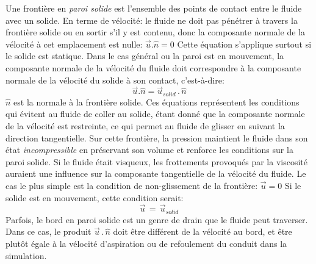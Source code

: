 \documentclass[11pt]{article}
\begin{document}
Une frontière en \textit{paroi solide} est l'ensemble des points de contact entre le fluide avec un solide. En terme de vélocité: le fluide ne doit pas pénétrer à travers la frontière solide ou en sortir s'il y est contenu, donc la composante normale de la vélocité à cet emplacement est nulle: $\overrightarrow{u}.\hat{n} = 0$ \newline
Cette équation s'applique surtout si le solide est statique. Dans le cas général ou la paroi est en mouvement, la composante normale de la vélocité du fluide doit correspondre à la composante normale de la vélocité du solide à son contact, c'est-à-dire:
	\begin{equation}
	\overrightarrow{u}.\hat{n} = \overrightarrow{u}\!	\!_{solid} \,.\, \hat{n}
	\end{equation}
$ \hat{n} $ est la normale à la frontière solide.
Ces équations représentent les conditions qui évitent au fluide de coller au solide, étant donné que la composante normale de la vélocité est restreinte, ce qui permet au fluide de glisser en suivant la direction tangentielle.
Sur cette frontière, la pression maintient le fluide dans son état \textit{incompressible} en préservant son volume et renforce les conditions sur la paroi solide.\newline 
Si le fluide était visqueux, les frottements provoqués par la viscosité auraient une influence sur la composante tangentielle de la vélocité du fluide. Le cas le plus simple est la condition de non-glissement de la frontière:
$\overrightarrow{u} = 0$ \newline
Si le solide est en mouvement, cette condition serait:
\begin{equation}
\overrightarrow{u} \,=\, \overrightarrow{u}\!\!_{solid}
\end{equation}
Parfois, le bord en paroi solide est un genre de drain que le fluide peut traverser. Dans ce cas, le produit $ \overrightarrow{u}\,.\,\hat{n} $ doit être différent de la vélocité au bord, et être plutôt égale à la vélocité d'aspiration ou de refoulement du conduit dans la simulation.
\end{document}
